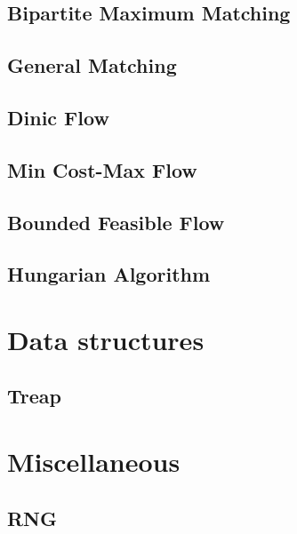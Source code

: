 \subsection{Bipartite Maximum Matching}
\raggedbottom
\hrulefill
\subsection{General Matching}
\raggedbottom
\hrulefill
\subsection{Dinic Flow}
\raggedbottom
\hrulefill
\subsection{Min Cost-Max Flow}
\raggedbottom
\hrulefill
\subsection{Bounded Feasible Flow}
\raggedbottom
\hrulefill
\subsection{Hungarian Algorithm}
\raggedbottom
\hrulefill

\section{Data structures}
\subsection{Treap}
\raggedbottom
\hrulefill

\section{Miscellaneous}
\subsection{RNG}
\raggedbottom
\hrulefill

